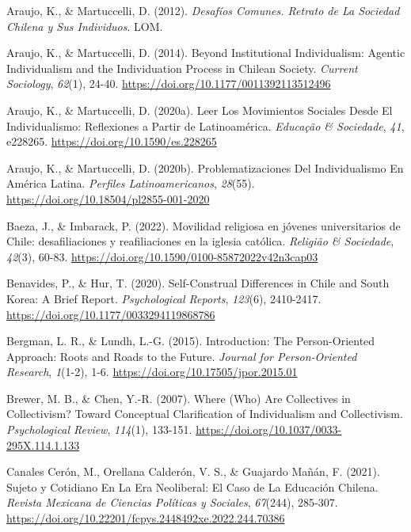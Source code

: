 \documentclass[
  12pt,
  letterpaper,
  DIV=11,
  numbers=noendperiod]{scrartcl}
\newlength{\cslhangindent}
\newenvironment{CSLReferences}[2] %
 {\begin{list}{}{%
  \setlength{\itemindent}{0pt}
  \setlength{\leftmargin}{0pt}
  \setlength{\parsep}{0pt}
  \ifodd #1
   \setlength{\leftmargin}{\cslhangindent}
   \setlength{\itemindent}{-1\cslhangindent}
  \fi
  \setlength{\itemsep}{#2\baselineskip}}}
 {\end{list}}
\begin{document}
\label{refs}
\begin{CSLReferences}{1}{0}
Araujo, K., \& Martuccelli, D. (2012). \emph{Desaf{í}os {Comunes}.
{Retrato} de La Sociedad Chilena y Sus Individuos}. LOM.

Araujo, K., \& Martuccelli, D. (2014). Beyond Institutional
Individualism: {Agentic} Individualism and the Individuation Process in
{Chilean} Society. \emph{Current Sociology}, \emph{62}(1), 24-40.
\url{https://doi.org/10.1177/0011392113512496}

Araujo, K., \& Martuccelli, D. (2020a). Leer Los Movimientos Sociales
Desde El Individualismo: {Reflexiones} a Partir de {Latinoam{é}rica}.
\emph{Educa{ç}{ã}o \& Sociedade}, \emph{41}, e228265.
\url{https://doi.org/10.1590/es.228265}

Araujo, K., \& Martuccelli, D. (2020b). Problematizaciones Del
Individualismo En {Am{é}rica Latina}. \emph{Perfiles Latinoamericanos},
\emph{28}(55). \url{https://doi.org/10.18504/pl2855-001-2020}

Baeza, J., \& Imbarack, P. (2022). {Movilidad religiosa en j{ó}venes
universitarios de Chile: desafiliaciones y reafiliaciones en la iglesia
cat{ó}lica}. \emph{Religi{ã}o \& Sociedade}, \emph{42}(3), 60-83.
\url{https://doi.org/10.1590/0100-85872022v42n3cap03}

Benavides, P., \& Hur, T. (2020). Self-{Construal Differences} in
{Chile} and {South Korea}: {A Brief Report}. \emph{Psychological
Reports}, \emph{123}(6), 2410-2417.
\url{https://doi.org/10.1177/0033294119868786}

Bergman, L. R., \& Lundh, L.-G. (2015). Introduction: {The}
Person-Oriented Approach: {Roots} and Roads to the Future. \emph{Journal
for Person-Oriented Research}, \emph{1}(1-2), 1-6.
\url{https://doi.org/10.17505/jpor.2015.01}

Brewer, M. B., \& Chen, Y.-R. (2007). Where ({Who}) {Are Collectives} in
{Collectivism}? {Toward Conceptual Clarification} of {Individualism} and
{Collectivism}. \emph{Psychological Review}, \emph{114}(1), 133-151.
\url{https://doi.org/10.1037/0033-295X.114.1.133}

Canales Cerón, M., Orellana Calderón, V. S., \& Guajardo Mañán, F.
(2021). Sujeto y Cotidiano En La Era Neoliberal: El Caso de La
Educaci{ó}n Chilena. \emph{Revista Mexicana de Ciencias Pol{í}ticas y
Sociales}, \emph{67}(244), 285-307.
\url{https://doi.org/10.22201/fcpys.2448492xe.2022.244.70386}


\end{CSLReferences}
\end{document}
